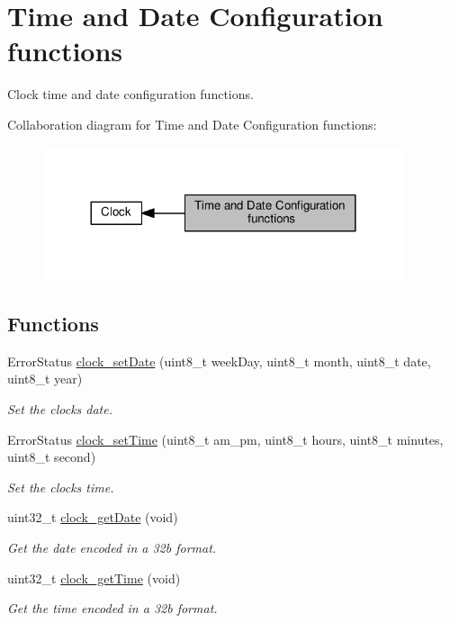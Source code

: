 \hypertarget{group___clock___time___date}{}\section{Time and Date Configuration functions}
\label{group___clock___time___date}


Clock time and date configuration functions.  


Collaboration diagram for Time and Date Configuration functions\+:\nopagebreak
\begin{figure}[H]
\begin{center}
\leavevmode
\includegraphics[width=300pt]{de/dbe/group___clock___time___date}
\end{center}
\end{figure}
\subsection*{Functions}
\begin{DoxyCompactItemize}
\item 
Error\+Status \hyperlink{group___clock___time___date_gaf16498fa2702bfda6b89a3335ccc7ca6}{clock\+\_\+set\+Date} (uint8\+\_\+t week\+Day, uint8\+\_\+t month, uint8\+\_\+t date, uint8\+\_\+t year)
\begin{DoxyCompactList}\small\item\em Set the clock\textquotesingle{}s date. \end{DoxyCompactList}\item 
Error\+Status \hyperlink{group___clock___time___date_ga11404197d58ddf6b46230bcde4282ef2}{clock\+\_\+set\+Time} (uint8\+\_\+t am\+\_\+pm, uint8\+\_\+t hours, uint8\+\_\+t minutes, uint8\+\_\+t second)
\begin{DoxyCompactList}\small\item\em Set the clock\textquotesingle{}s time. \end{DoxyCompactList}\item 
uint32\+\_\+t \hyperlink{group___clock___time___date_gabb4d72928cb3d131d40067fb141003aa}{clock\+\_\+get\+Date} (void)
\begin{DoxyCompactList}\small\item\em Get the date encoded in a 32b format. \end{DoxyCompactList}\item 
uint32\+\_\+t \hyperlink{group___clock___time___date_ga03ae6948083c259f6edc0b146f40dc62}{clock\+\_\+get\+Time} (void)
\begin{DoxyCompactList}\small\item\em Get the time encoded in a 32b format. \end{DoxyCompactList}\end{DoxyCompactItemize}


